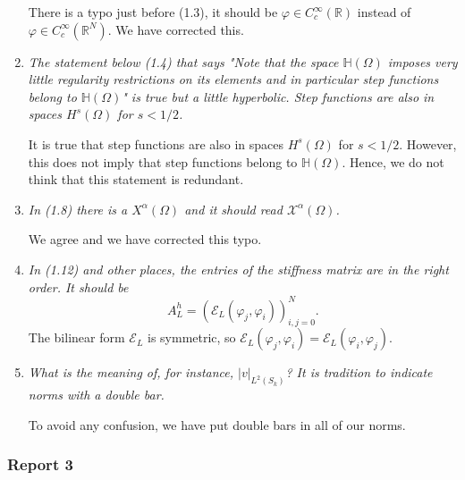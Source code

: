 \documentclass[11 pt]{article}
\numberwithin{equation}{section}
\def\R{\mathbb{R}}
\begin{document}
\begin{enumerate}
    There is a typo just before (1.3), it should be $\varphi\in C^\infty_c(\R)$ instead of $\varphi\in C^\infty_c(\R^N)$.  We have corrected this.

    \item \emph{The statement below (1.4) that says "Note that the space \(\mathbb H(\Omega) \) imposes very little regularity restrictions on its elements and in particular step functions belong to \( \mathbb H(\Omega) \)" is true but a little hyperbolic. Step functions are also in spaces \( H^s(\Omega) \) for \( s < 1/2 \).}

    It is true that step functions are also in spaces \( H^s(\Omega) \) for \( s < 1/2 \). However, this does not imply that step functions belong to \( \mathbb H(\Omega) \). Hence, we do not think that this statement is redundant.

    \item \emph{In (1.8) there is a $X^\alpha(\Omega)$ and it should read $\mathcal X^\alpha(\Omega)$.}

    We agree and we have corrected this typo.

    \item \emph{In (1.12) and other places, the entries of the stiffness matrix are in the right order. It should be
    \[
    A_L^h = (\mathcal E_L(\varphi_j, \varphi_i))_{i,j=0}^{N}.
    \]}
    The bilinear form $\mathcal E_L$ is symmetric, so $\mathcal E_L(\varphi_j, \varphi_i)=\mathcal E_L(\varphi_i, \varphi_j)$.

    \item \emph{What is the meaning of, for instance, \( |v|_{L^2(S_k)} \)? It is tradition to indicate norms with a double bar.}

To avoid any confusion, we have put double bars in all of our norms.
\end{enumerate}


\newpage


\subsubsection*{Report 3}
\end{document}
